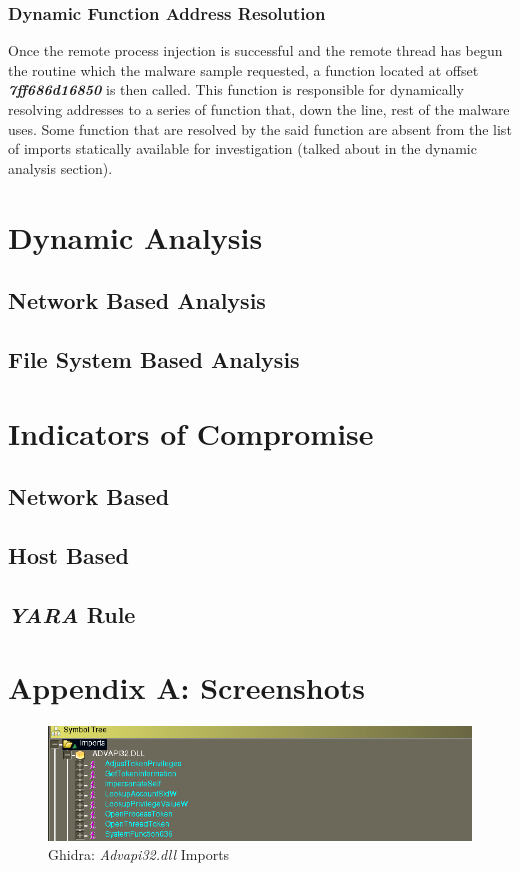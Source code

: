 \documentclass[10pt,a4paper]{article}
\begin{document}
		\subsubsection*{Dynamic Function Address Resolution}
		\vspace{-1em}
		Once the remote process injection is successful and the remote thread has begun the routine which the malware sample requested, a function located at offset \textit{\textbf{7ff686d16850}} is then called.
		This function is responsible for dynamically resolving addresses to a series of function that, down the line, rest of the malware uses.
		Some function that are resolved by the said function are absent from the list of imports statically available for investigation (talked about in the dynamic analysis section).

\newpage
\section{Dynamic Analysis}
	\subsection{Network Based Analysis}
	\subsection{File System Based Analysis}

\newpage

\section{Indicators of Compromise}
	\subsection{Network Based}
	\subsection{Host Based}
	\subsection{\textit{YARA} Rule}
		

\newpage

\section{Appendix A: Screenshots}
\begin{figure}[!htbp]%
	\centering
	\includegraphics[width=\columnwidth]{pics/importsAdvapi32.png}
	\caption{Ghidra: \textit{Advapi32.dll} Imports}
	\label{importsAdvapi32}
\end{figure}
\end{document}
